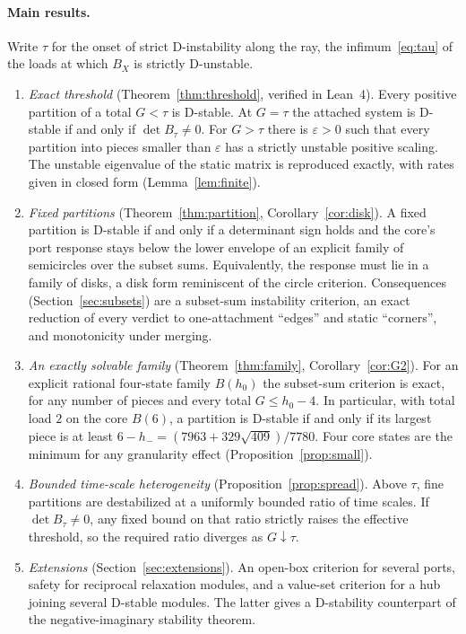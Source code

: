 \documentclass[11pt,a4paper]{article}
\theoremstyle{plain}
\theoremstyle{definition}
\theoremstyle{remark}
\begin{document}
\paragraph{Main results.}
Write $\tau$ for the onset of strict D-instability along the ray, the
infimum~\eqref{eq:tau} of the loads at which $B_X$ is strictly D-unstable.
\begin{enumerate}[label=(\Alph*),leftmargin=2.2em]
\item \emph{Exact threshold} (Theorem~\ref{thm:threshold}, verified in
Lean~4). Every positive partition of a total $G<\tau$ is D-stable. At $G=\tau$
the attached system is D-stable if and only if $\det B_\tau\ne0$. For
$G>\tau$ there is $\varepsilon>0$ such that every partition into pieces
smaller than $\varepsilon$ has a strictly unstable positive scaling. The
unstable eigenvalue of the static matrix is reproduced exactly, with rates
given in closed form (Lemma~\ref{lem:finite}).
\item \emph{Fixed partitions} (Theorem~\ref{thm:partition},
Corollary~\ref{cor:disk}). A fixed partition is D-stable if and only if a
determinant sign holds and the core's port response stays below the lower
envelope of an explicit family of semicircles over the subset sums. Equivalently, the response must lie in a
family of disks, a disk form reminiscent of the circle criterion. Consequences
(Section~\ref{sec:subsets}) are a subset-sum instability criterion, an exact
reduction of every verdict to one-attachment ``edges'' and static
``corners'', and monotonicity under merging.
\item \emph{An exactly solvable family} (Theorem~\ref{thm:family},
Corollary~\ref{cor:G2}). For an explicit rational four-state
family $B(h_0)$ the subset-sum criterion is exact, for any number of pieces and
every total $G\le h_0-4$. In particular, with
total load $2$ on the core $B(6)$, a partition is D-stable if and only if its
largest piece is at least $6-h_-=(7963+329\sqrt{409})/7780$. Four core
states are the minimum for any granularity effect
(Proposition~\ref{prop:small}).
\item \emph{Bounded time-scale heterogeneity} (Proposition~\ref{prop:spread}).
Above $\tau$, fine partitions are destabilized at a uniformly bounded ratio of
time scales. If $\det B_\tau\ne0$, any fixed bound on that ratio strictly
raises the effective threshold, so the required ratio diverges as
$G\downarrow\tau$.
\item \emph{Extensions} (Section~\ref{sec:extensions}). An open-box criterion
for several ports, safety for reciprocal relaxation modules, and a value-set
criterion for a hub joining several D-stable modules. The latter gives a
D-stability counterpart of the negative-imaginary stability theorem.
\end{enumerate}
\end{document}
